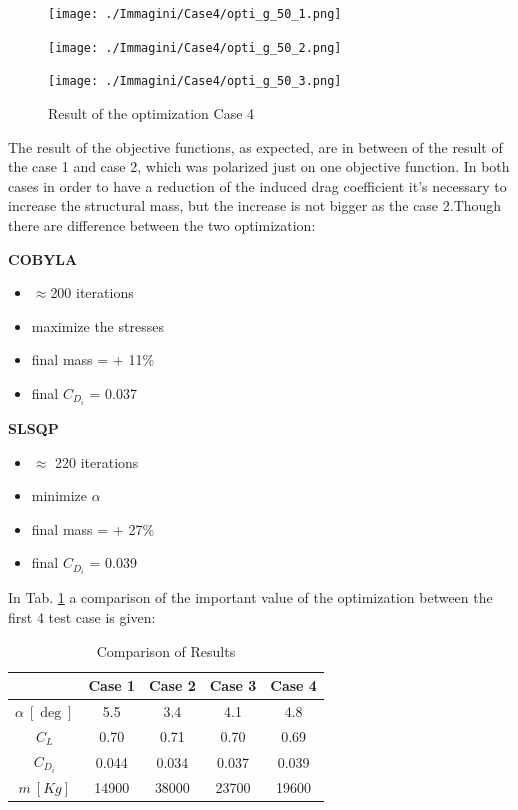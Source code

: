\begin{figure}[H]
	\centering
	\texttt{[image: ./Immagini/Case4/opti\_g\_50\_1.png]}
\end{figure}
\begin{figure}[H]
	\centering
	\texttt{[image: ./Immagini/Case4/opti\_g\_50\_2.png]}
\end{figure}
\begin{figure}[H]
	\centering
	\texttt{[image: ./Immagini/Case4/opti\_g\_50\_3.png]}
	\caption{Result of the optimization Case 4}
	\label{fig:6_5}
\end{figure}
The result of the objective functions, as expected, are in between of the result of the case 1 and case 2, which was polarized just on one objective function. In both cases in order to have a reduction of the induced drag coefficient it's necessary to increase the structural mass, but the increase is not bigger as the case 2.Though there are difference between the two optimization:

\begin{paracol}{2}
	\begin{leftcolumn*}
		\centering
		\textbf{COBYLA}
\begin{itemize}
	\item $\approx$200 iterations
	\item maximize the stresses
	\item final mass = + 11\%
	\item final $C_{D_i}$ = 0.037
\end{itemize}
	\end{leftcolumn*}
	\begin{rightcolumn}
		\centering
		\textbf{SLSQP}
		\begin{itemize}
			\item $\approx$ 220 iterations
			\item minimize $\alpha$
			\item final mass = + 27\%
			\item final $C_{D_i}$ = 0.039
				\end{itemize}
	\end{rightcolumn}
\end{paracol}
In Tab. \ref{tab:t5} a comparison of the important value of the optimization between the first 4 test case is given:
\begin{table}[H]
	\centering
	\begin{tabular}{|c|c|c|c|c|}
		\hline
		& Case 1 & Case 2 & Case 3 & Case 4 \\ \hline
		$\alpha \ [\deg]$ & 5.5    & 3.4    & 4.1    & 4.8    \\ \hline
		$C_L$             & 0.70   & 0.71   & 0.70   & 0.69   \\ \hline
		$C_{D_i}$         & 0.044  & 0.034  & 0.037  & 0.039  \\ \hline
		$m \ [Kg]$        & 14900  & 38000  & 23700  & 19600  \\ \hline
		
	\end{tabular}
	\caption{Comparison of Results}
	\label{tab:t5}
\end{table}

